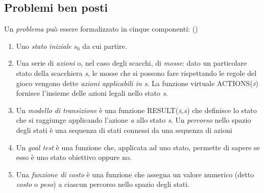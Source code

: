 \subsection{Problemi ben posti}
Un \emph{problema} può essere formalizzato in cinque componenti: (\cite{randw})
\begin{enumerate}
   \item Uno \emph{stato iniziale} $s_0$ da cui partire.
   \item Una serie di \emph{azioni} o, nel caso degli scacchi, di \emph{mosse}: dato un particolare stato della scacchiera \emph{s}, le mosse che si possono fare rispettando le regole del gioco vengono dette \emph{azioni applicabili in \emph{s}}. La funzione virtuale \textsc{ACTIONS(\emph{s})} fornisce l'insieme delle azioni legali nello stato \emph{s}.
   \item Un \emph{modello di transizione} è una funzione \textsc{RESULT(\emph{s},\emph{a})} che definisce lo stato che si raggiunge applicando l'azione \emph{a} allo stato \emph{s}.
Un \emph{percorso} nello spazio degli stati è una sequenza di stati connessi da una sequenza di azioni
   \item Un \emph{goal test} è una funzione che, applicata ad uno stato, permette di sapere se esso è uno stato obiettivo oppure no.
   \item Una \emph{funzione di costo} è una funzione che assegna un valore numerico (detto \emph{costo} o \emph{peso}) a ciascun percorso nello spazio degli stati.
\end{enumerate}

